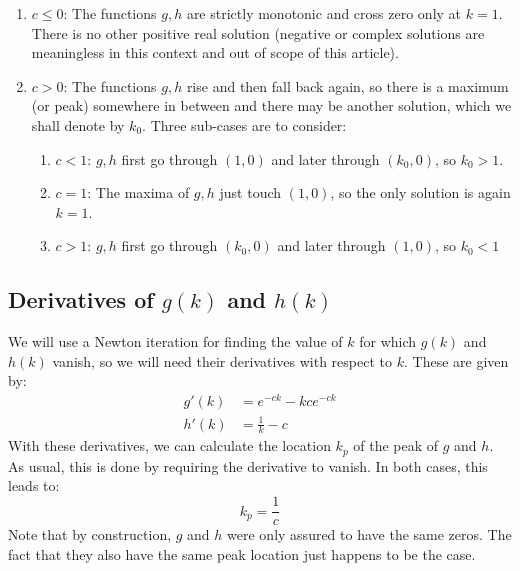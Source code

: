 \begin{enumerate}
	\item $c \leq 0$: The functions $g, h$ are strictly monotonic and cross zero only at $k=1$. There is no other positive real solution (negative or complex solutions are meaningless in this context and out of scope of this article).
	\item $c > 0$: The functions $g, h$ rise and then fall back again, so there is a maximum (or peak) somewhere in between and there may be another solution, which we shall denote by $k_0$. Three sub-cases are to consider:
  \begin{enumerate}
	  \item $c < 1$: $g, h$ first go through $(1, 0)$ and later through $(k_0, 0)$, so $k_0 > 1$.
	  \item $c = 1$: The maxima of $g, h$	just touch $(1, 0)$, so the only solution is again $k = 1$.
	  \item $c > 1$: $g, h$ first go through $(k_0, 0)$ and later through $(1, 0)$, so $k_0 < 1$
  \end{enumerate}		
\end{enumerate}

\subsection{Derivatives of $g(k)$ and $h(k)$}
We will use a Newton iteration for finding the value of $k$ for which $g(k)$ and $h(k)$ vanish, so we will need their derivatives with respect to $k$. These are given by:
\begin{equation}
 \boxed
 {
  \begin{aligned}
   g'(k) &= e^{-c k} - k c e^{-c k} \\
   h'(k) &= \frac{1}{k} - c
  \end{aligned}
 }
\end{equation}
With these derivatives, we can calculate the location $k_p$ of the peak of $g$ and $h$. As usual, this is done by requiring the derivative to vanish. In both cases, this leads to:
\begin{equation}
 \label{Eq:PeakValueForK}
 \boxed
 {
  k_p = \frac{1}{c}
 }
\end{equation}
Note that by construction, $g$ and $h$ were only assured to have the same zeros. The fact that they also have the same peak location just happens to be the case.

